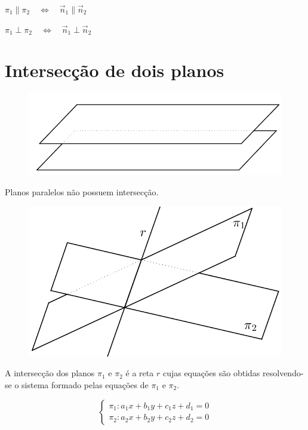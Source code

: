 $\pi_1\parallel \pi_2 \quad\Longleftrightarrow \quad \vec n_1 \parallel \vec n_2$

$\pi_1\perp \pi_2 \quad\Longleftrightarrow \quad \vec n_1 \perp \vec n_2$

\section{Intersecção de dois planos}

\begin{multicols}{2}
\begin{figure}[H]
\centering
\includegraphics[scale=1]{analitica/imagens/planos-par.png}
\end{figure}

\noindent Planos paralelos não possuem intersecção.

\end{multicols}

\begin{multicols}{2}
\begin{figure}[H]
\centering
\includegraphics[scale=1]{analitica/imagens/planos-inter.png}
\end{figure}

\noindent A intersecção dos planos $\pi_1$ e $\pi_2$ é a reta $r$ cujas equações são obtidas resolvendo-se o sistema formado pelas equações de $\pi_1$ e $\pi_2$.

$$\left\{ \begin{array}{l} \pi_1: a_1x+b_1y+c_1z+d_1=0\\   \pi_2: a_2x+b_2y+c_2z+d_2=0 \end{array} \right.$$


\end{multicols}




